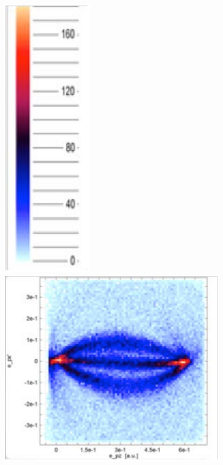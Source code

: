 \documentclass{article}
\begin{document}
\begin{figure}
\begin{center}
\includegraphics[scale=0.4]{figures/HeExp_results2a}
\includegraphics[scale=0.4]{figures/HeExp_results2b}

\end{center}
\end{figure}
\end{document}
